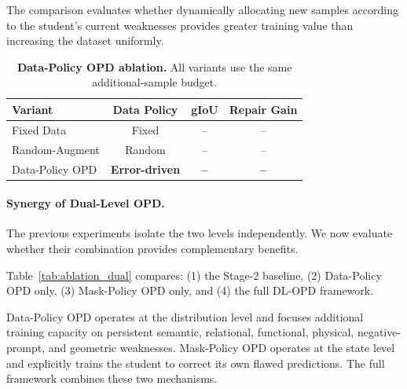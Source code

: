 The comparison evaluates whether dynamically allocating new samples according to the student's current weaknesses provides greater training value than increasing the dataset uniformly.


\begin{table}[t]
    \centering
    \caption{
    \textbf{Data-Policy OPD ablation.}
    All variants use the same additional-sample budget.
    }
    \label{tab:ablation_data_policy}
    \small
    \setlength{\tabcolsep}{4pt}
    \begin{tabular}{lccc}
        \toprule
        \textbf{Variant}
        & Data Policy
        & gIoU
        & Repair Gain \\
        \midrule
        Fixed Data
        & Fixed
        & --
        & -- \\

        Random-Augment
        & Random
        & --
        & -- \\

        Data-Policy OPD
        & \textbf{Error-driven}
        & \textbf{--}
        & \textbf{--} \\
        \bottomrule
    \end{tabular}
\end{table}


\paragraph{Synergy of Dual-Level OPD.}
The previous experiments isolate the two levels independently.
We now evaluate whether their combination provides complementary benefits.

Table~\ref{tab:ablation_dual} compares:
(1) the Stage-2 baseline,
(2) Data-Policy OPD only,
(3) Mask-Policy OPD only, and
(4) the full DL-OPD framework.

Data-Policy OPD operates at the distribution level and focuses additional training capacity on persistent semantic, relational, functional, physical, negative-prompt, and geometric weaknesses.
Mask-Policy OPD operates at the state level and explicitly trains the student to correct its own flawed predictions.
The full framework combines these two mechanisms.



